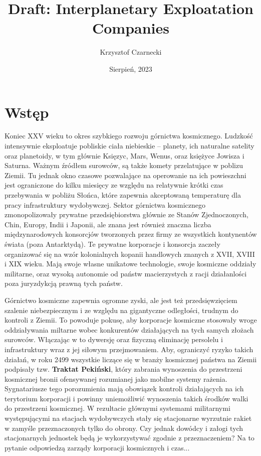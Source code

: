 \documentclass[11pt,a4paper]{article}
\begin{document}
\title{Draft: Interplanetary Exploatation Companies}
\author{Krzysztof Czarnecki}
\date{Sierpień, 2023}
\maketitle

\section{Wstęp}

Koniec XXV wieku to okres szybkiego rozwoju górnictwa kosmicznego. Ludzkość intensywnie eksploatuje pobliskie ciała niebieskie -- planety, ich naturalne satelity oraz planetoidy, w tym głównie Księzyc, Mars, Wenus, oraz księżyce Jowisza i Saturna. Ważnym źródłem surowców, są także komety przelatujące w poblizu Ziemii. Tu jednak okno czasowe pozwalające na operowanie na ich powieszchni jest ograniczone do kilku miesięcy ze względu na relatywnie krótki czas przebywania w pobliżu Słońca, które zapewnia akceptowaną temperaturę dla pracy infrastruktury wydobywczej. Sektor górnictwa kosmicznego zmonopolizowały prywatne przedsiębiorstwa głównie ze Stanów Zjednoczonych, Chin, Europy, Indii i Japonii, ale znana jest również znaczna liczba międzynarodowych konsorcjów tworzonych przez firmy ze wszystkich kontynentów świata (poza Antarktydą). Te prywatne korporacje i konsorcja zaczeły organizować się na wzór kolonialnych kopanii handlowych znanych z XVII, XVIII i XIX wieku. Mają swoje własne unikatowe technologie, swoje kosmiczne oddziały militarne, oraz wysoką autonomie od państw macierzystych z racji działanlości poza juryzdykcją prawną tych państw.  

Górnictwo kosmiczne zapewnia ogromne zyski, ale jest też przedsięwzięciem szalenie niebezpiecznym i ze względu na gigantyczne odległości, trudnym do kontroli z Ziemii. To powoduje pokusę, aby korporacje kosmiczne stosowały wroge oddziaływania miltarne wobec konkurentów działających na tych samych złożach surowców. Włączając w to dywersję oraz fizyczną eliminację persolelu i infrastruktury wraz z jej siłowym przejmowaniem. Aby, ograniczyć ryzyko takich działań, w roku 2499 wszystkie liczące się w branży kosmicznej państwa na Ziemii podpisały tzw. \textbf{Traktat Pekiński}, który zabrania wynoszenia do przestrzeni kosmicznej bronii ofensywanej rozumianej jako mobilne systemy rażenia. Sygnatariusze tego porozumienia mają obowiązek kontroli działających na ich terytorium korporacji i powinny uniemożliwić wynoszenia takich środków walki do przestrzeni kosmicznej. W rezultacie głównymi systemami militarnymi występującymi na stacjach wydobywczych stały się stacjonarne wyrzutnie rakiet w zamyśle przeznaczonych tylko do obrony. Czy jednak dowódcy i załogi tych stacjonarnych jednostek będą je wykorzystywać zgodnie z przeznaczeniem? Na to pytanie odpowiedzą zarządy korporacji kosmicznych i czas...
\newpage
\end{document}

